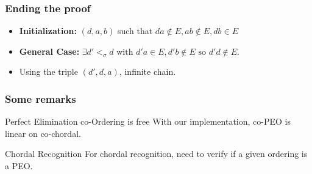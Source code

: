 \documentclass{beamer}
\begin{document}
\begin{frame}\frametitle{Ending the proof}

    \begin{center}
    \end{center}

    \begin{itemize}
	\item \textbf{Initialization:} $(d, a, b)$ such that $da \notin E, ab \notin E, db \in E$
	\item \textbf{General Case:} $\exists d' <_{\sigma} d\text{ with }d'a \in E, d'b \notin E\text{ so }d'd \notin E$.
	\item Using the triple $(d', d, a)$, infinite chain.
    \end{itemize}

\end{frame}


\begin{frame}\frametitle{Some remarks}
     \begin{block}{Perfect Elimination co-Ordering is free}
	  With our implementation, co-PEO is linear on co-chordal.
     \end{block}


     \begin{alertblock}{Chordal Recognition}
	  For chordal recognition, need to verify if a given ordering is a PEO.
     \end{alertblock}
\end{frame}
\end{document}
